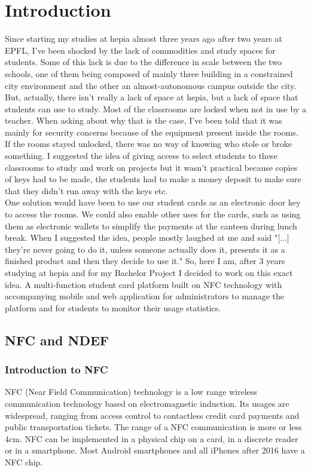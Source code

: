 \documentclass[11pt,a4paper]{report}
\begin{document}
\chapter{Introduction}
Since starting my studies at hepia almost three years ago after two years at EPFL, I've been shocked by the lack of commodities and study spaces for students. Some of this lack is due to the difference in scale between the two schools, one of them being composed of mainly three building in a constrained city environment and the other an almost-autonomous campus outside the city. But, actually, there isn't really a lack of space at hepia, but a lack of space that students can use to study. Most of the classrooms are locked when not in use by a teacher. When asking about why that is the case, I've been told that it was mainly for security concerns because of the equipment present inside the rooms. If the rooms stayed unlocked, there was no way of knowing who stole or broke something. I suggested the idea of giving access to select students to these classrooms to study and work on projects but it wasn't practical because copies of keys had to be made, the students had to make a money deposit to make sure that they didn't run away with the keys etc.\\ 

One solution would have been to use our student cards as an electronic door key to access the rooms. We could also enable other uses for the cards, such as using them as electronic wallets to simplify the payments at the canteen during lunch break. When I suggested the idea, people mostly laughed at me and said "[...] they're never going to do it, unless someone actually does it, presents it as a finished product and then they decide to use it." So, here I am, after 3 years studying at hepia and for my Bachelor Project I decided to work on this exact idea. A multi-function student card platform built on NFC technology with accompanying mobile and web application for administrators to manage the platform and for students to monitor their usage statistics.


\section{NFC and NDEF}
\subsection{Introduction to NFC}
NFC (Near Field Communication) technology is a low range wireless communication technology based on electromagnetic induction. Its usages are widespread, ranging from access control to contactless credit card payments and public transportation tickets. The range of a NFC communication is more or less 4cm. NFC can be implemented in a physical chip on a card, in a discrete reader or in a smartphone. Most Android smartphones and all iPhones after 2016 have a NFC chip. \\
\end{document}
